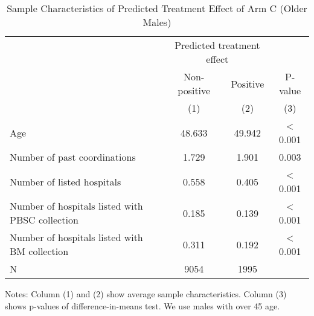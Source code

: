 \documentclass[
]{article}
\begin{document}
\begin{table}[H]

\caption{\label{tab:rcf-older-male}Sample Characteristics of Predicted Treatment Effect of Arm C (Older Males)}
\centering
\fontsize{9}{11}\selectfont
\fontsize{9}{11}\selectfont
\begin{threeparttable}
\begin{tabular}[t]{lccc}
\toprule
\multicolumn{1}{c}{ } & \multicolumn{2}{c}{Predicted treatment effect} & \multicolumn{1}{c}{ } \\
\cmidrule(l{3pt}r{3pt}){2-3}
\multicolumn{1}{c}{ } & \multicolumn{1}{c}{Non-positive} & \multicolumn{1}{c}{Positive} & \multicolumn{1}{c}{P-value} \\
\cmidrule(l{3pt}r{3pt}){2-2} \cmidrule(l{3pt}r{3pt}){3-3} \cmidrule(l{3pt}r{3pt}){4-4}
 & (1) & (2) & (3)\\
\midrule
Age & 48.633 & 49.942 & < 0.001\\
Number of past coordinations & 1.729 & 1.901 & 0.003\\
Number of listed hospitals & 0.558 & 0.405 & < 0.001\\
Number of hospitals listed with PBSC collection & 0.185 & 0.139 & < 0.001\\
Number of hospitals listed with BM collection & 0.311 & 0.192 & < 0.001\\
N & 9054 & 1995 & \\
\bottomrule
\end{tabular}
\begin{tablenotes}
\item Notes: Column (1) and (2) show average sample characteristics. Column (3) shows p-values of difference-in-means test. We use males with over 45 age.
\end{tablenotes}
\end{threeparttable}
\end{table}
\end{document}
